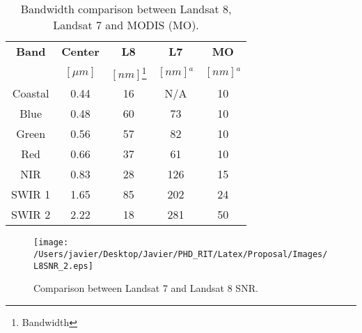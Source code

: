 \begin{table}[!ht]
\caption{ Bandwidth comparison between Landsat 8, Landsat 7 and MODIS (MO). \label{tab:bandwidth}} 
\centering
      \begin{tabular}{c|c|c|c|c}
          \bfseries{Band}& \bfseries{Center}   & \bfseries{L8} & \bfseries{L7} & \bfseries{MO} \\ 
                  & \bfseries{$[\mu m]$} & $[nm]$\footnote{Bandwidth}   & $[nm]${\it $^a$} & $[nm]${\it $^a$}   \\ \hline \hline
          Coastal & 0.44 & 16 & N/A & 10  \\
          Blue    & 0.48 & 60 & 73  & 10  \\
          Green   & 0.56 & 57 & 82  & 10  \\
          Red     & 0.66 & 37 & 61  & 10  \\  
          NIR     & 0.83 & 28 & 126 & 15  \\
          SWIR 1  & 1.65 & 85 & 202 & 24  \\
          SWIR 2  & 2.22 & 18 & 281 & 50  \\ 
       \end{tabular}
\end{table}

\begin{figure}[htb]
\centering
      \texttt{[image: /Users/javier/Desktop/Javier/PHD\_RIT/Latex/Proposal/Images/L8SNR\_2.eps]}
      \caption{Comparison between Landsat 7 and Landsat 8 SNR. \label{fig:L8SNR} } 
      \label{fig:olisnr}
\end{figure}

